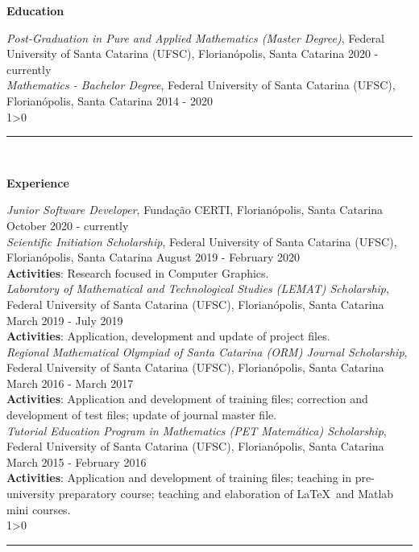 \documentclass[a4paper,10pt]{article}
\newcommand{\createSection}[4][0]{
    \noindent
	\begin{minipage}{0.16\linewidth}
		\large{\textbf{#2}}
		\vspace{#3\baselineskip}
	\end{minipage}
	\hfill
	\begin{minipage}{0.79\linewidth}
		#4
		\ifnum0#1>0 { \hrule {\ } } \fi
	\end{minipage}
	\vspace{\baselineskip}
}
\begin{document}
	\vspace{\baselineskip}
	
    \createSection[1]{Education}{4}{
	    \textit{Post-Graduation in Pure and Applied Mathematics (Master Degree)}, Federal University of Santa Catarina (UFSC), Florianópolis, Santa Catarina \hfill 2020 - currently \\
		
		\textit{Mathematics - Bachelor Degree}, Federal University of Santa Catarina (UFSC), Florianópolis, Santa Catarina \hfill 2014 - 2020 \\
	}
	
	\createSection[1]{Experience}{17}{
	    \textit{Junior Software Developer}, Fundação CERTI, Florianópolis, Santa Catarina \hfill October 2020 - currently \\
	    
	    \textit{Scientific Initiation Scholarship}, Federal University of Santa Catarina (UFSC), Florianópolis, Santa Catarina \hfill August 2019 - February 2020 \\
		\textbf{Activities}: Research focused in Computer Graphics.\\
		
		
		\textit{Laboratory of Mathematical and Technological Studies (LEMAT) Scholarship}, Federal University of Santa Catarina (UFSC), Florianópolis, Santa Catarina \hfill March 2019 - July 2019 \\
		\textbf{Activities}: Application, development and update of project files.\\
		
		\textit{Regional Mathematical Olympiad of Santa Catarina (ORM) Journal Scholarship}, Federal University of Santa Catarina (UFSC), Florianópolis, Santa Catarina \hfill March 2016 - March 2017 \\
		\textbf{Activities}: Application and development of training files; correction and development of test files; update of journal master file.\\
		
		\textit{Tutorial Education Program in Mathematics (PET Matemática) Scholarship}, Federal University of Santa Catarina (UFSC), Florianópolis, Santa Catarina \hfill March 2015 - February 2016 \\
		\textbf{Activities}: Application and development of training files; teaching in pre-university preparatory course; teaching and elaboration of \LaTeX\ and Matlab mini courses.\\
	}
    
\end{document}

